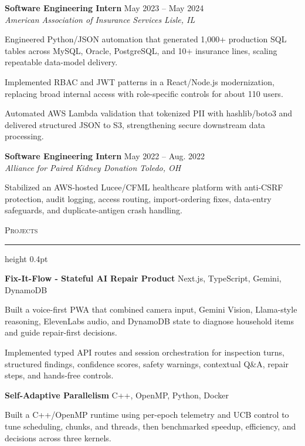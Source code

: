 \documentclass[letterpaper,11pt]{article}
\newcommand{\resumesection}[1]{%
  \par\vspace{2pt}%
  {\large\scshape #1}\par\vspace{2pt}%
  \hrule height 0.4pt\vspace{2pt}%
}
\newcommand{\resumeSubheading}[4]{
  \textbf{#1} \hfill #2\\
  \textit{#3} \hfill \textit{#4}
}
\newcommand{\projectHeading}[2]{
  \textbf{#1} \hfill #2
}
\begin{document}
\resumeSubheading
{Software Engineering Intern}{May 2023 -- May 2024}
{American Association of Insurance Services}{Lisle, IL}
\begin{tightitemize}
  \item Engineered Python/JSON automation that generated 1,000+ production SQL tables across MySQL, Oracle, PostgreSQL, and 10+ insurance lines, scaling repeatable data-model delivery.
  \item Implemented RBAC and JWT patterns in a React/Node.js modernization, replacing broad internal access with role-specific controls for about 110 users.
  \item Automated AWS Lambda validation that tokenized PII with hashlib/boto3 and delivered structured JSON to S3, strengthening secure downstream data processing.
\end{tightitemize}

\resumeSubheading
{Software Engineering Intern}{May 2022 -- Aug. 2022}
{Alliance for Paired Kidney Donation}{Toledo, OH}
\begin{tightitemize}
  \item Stabilized an AWS-hosted Lucee/CFML healthcare platform with anti-CSRF protection, audit logging, access routing, import-ordering fixes, data-entry safeguards, and duplicate-antigen crash handling.
\end{tightitemize}

\resumesection{Projects}
\projectHeading{Fix-It-Flow - Stateful AI Repair Product}{Next.js, TypeScript, Gemini, DynamoDB}
\begin{tightitemize}
  \item Built a voice-first PWA that combined camera input, Gemini Vision, Llama-style reasoning, ElevenLabs audio, and DynamoDB state to diagnose household items and guide repair-first decisions.
  \item Implemented typed API routes and session orchestration for inspection turns, structured findings, confidence scores, safety warnings, contextual Q\&A, repair steps, and hands-free controls.
\end{tightitemize}

\projectHeading{Self-Adaptive Parallelism}{C++, OpenMP, Python, Docker}
\begin{tightitemize}
  \item Built a C++/OpenMP runtime using per-epoch telemetry and UCB control to tune scheduling, chunks, and threads, then benchmarked speedup, efficiency, and decisions across three kernels.
\end{tightitemize}
\end{document}
